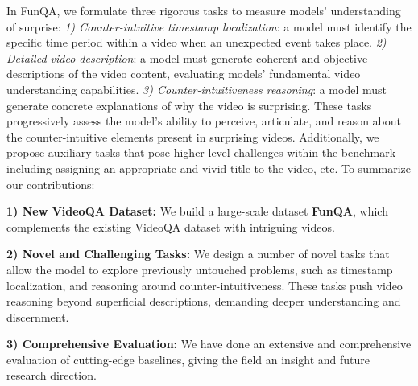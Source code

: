 

In FunQA, we formulate three rigorous tasks to measure models' understanding of surprise:
\textit{1) Counter-intuitive timestamp localization}: a model must %
identify the specific time period within a video when an unexpected event takes place.
\textit{2) Detailed video description}: a model must generate coherent and objective descriptions of the video content, evaluating models' fundamental video understanding capabilities.
\textit{3) Counter-intuitiveness reasoning}: a model must generate concrete explanations of why the video is surprising. %
These tasks progressively assess the model's ability to perceive, articulate, and reason about the counter-intuitive elements present in surprising videos. Additionally, we propose auxiliary tasks that pose higher-level challenges within the benchmark including assigning an appropriate and vivid title to the video, etc. 
To summarize our contributions: 

\textbf{1) New VideoQA Dataset:} We build a large-scale dataset \textbf{FunQA}, which complements the existing VideoQA dataset with intriguing videos.

\textbf{2) Novel and Challenging Tasks:} We design a number of novel tasks that allow the model to explore previously untouched problems, such as timestamp localization, and reasoning around counter-intuitiveness. These tasks push video reasoning beyond superficial descriptions, demanding deeper understanding and discernment.

\textbf{3) Comprehensive Evaluation:} We have done an extensive and comprehensive evaluation of cutting-edge baselines, giving the field an insight and future research direction. 

